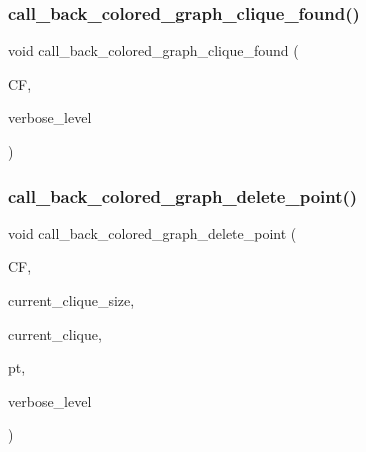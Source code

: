 \mbox{\label{rainbow__cliques_8_c_a89374a6e88e7da1264c7e1b594ec3559}} 
\subsubsection{\texorpdfstring{call\+\_\+back\+\_\+colored\+\_\+graph\+\_\+clique\+\_\+found()}{call\_back\_colored\_graph\_clique\_found()}}
{\footnotesize\ttfamily void call\+\_\+back\+\_\+colored\+\_\+graph\+\_\+clique\+\_\+found (\begin{DoxyParamCaption}\item[{\mbox{\hyperlink{classclique__finder}{clique\+\_\+finder}} $\ast$}]{CF,  }\item[{\mbox{\hyperlink{galois_8h_a09fddde158a3a20bd2dcadb609de11dc}{I\+NT}}}]{verbose\+\_\+level }\end{DoxyParamCaption})}

\mbox{\label{rainbow__cliques_8_c_ac29d571afa3e2eeb6e05793570c59f9c}} 
\subsubsection{\texorpdfstring{call\+\_\+back\+\_\+colored\+\_\+graph\+\_\+delete\+\_\+point()}{call\_back\_colored\_graph\_delete\_point()}}
{\footnotesize\ttfamily void call\+\_\+back\+\_\+colored\+\_\+graph\+\_\+delete\+\_\+point (\begin{DoxyParamCaption}\item[{\mbox{\hyperlink{classclique__finder}{clique\+\_\+finder}} $\ast$}]{CF,  }\item[{\mbox{\hyperlink{galois_8h_a09fddde158a3a20bd2dcadb609de11dc}{I\+NT}}}]{current\+\_\+clique\+\_\+size,  }\item[{\mbox{\hyperlink{galois_8h_a09fddde158a3a20bd2dcadb609de11dc}{I\+NT}} $\ast$}]{current\+\_\+clique,  }\item[{\mbox{\hyperlink{galois_8h_a09fddde158a3a20bd2dcadb609de11dc}{I\+NT}}}]{pt,  }\item[{\mbox{\hyperlink{galois_8h_a09fddde158a3a20bd2dcadb609de11dc}{I\+NT}}}]{verbose\+\_\+level }\end{DoxyParamCaption})}

